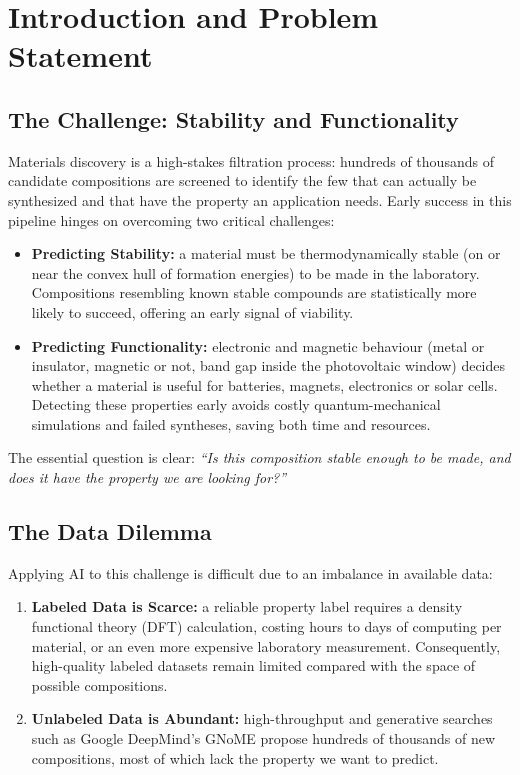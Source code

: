 \clearpage
\section{Introduction and Problem Statement}

\subsection{The Challenge: Stability and Functionality}

Materials discovery is a high-stakes filtration process: hundreds of thousands of candidate
compositions are screened to identify the few that can actually be synthesized and that have
the property an application needs. Early success in this pipeline hinges on overcoming two
critical challenges:

\begin{itemize}
  \item \textbf{Predicting Stability:} a material must be thermodynamically stable (on or near
  the convex hull of formation energies) to be made in the laboratory. Compositions resembling
  known stable compounds are statistically more likely to succeed, offering an early signal of
  viability.
  \item \textbf{Predicting Functionality:} electronic and magnetic behaviour (metal or
  insulator, magnetic or not, band gap inside the photovoltaic window) decides whether a
  material is useful for batteries, magnets, electronics or solar cells. Detecting these
  properties early avoids costly quantum-mechanical simulations and failed syntheses, saving
  both time and resources.
\end{itemize}

The essential question is clear: \emph{``Is this composition stable enough to be made, and does
it have the property we are looking for?''}

\subsection{The Data Dilemma}

Applying AI to this challenge is difficult due to an imbalance in available data:

\begin{enumerate}
  \item \textbf{Labeled Data is Scarce:} a reliable property label requires a density
  functional theory (DFT) calculation, costing hours to days of computing per material, or an
  even more expensive laboratory measurement. Consequently, high-quality labeled datasets
  remain limited compared with the space of possible compositions.
  \item \textbf{Unlabeled Data is Abundant:} high-throughput and generative searches such as
  Google DeepMind's GNoME propose hundreds of thousands of new compositions, most of which lack
  the property we want to predict.
\end{enumerate}

